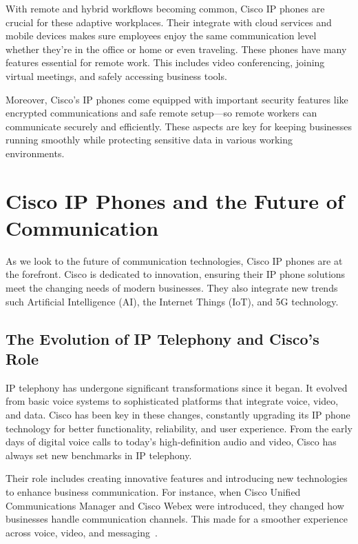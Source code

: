 \documentclass[11pt,a4paper]{article}
\begin{document}
With remote and hybrid workflows becoming common, Cisco IP phones are crucial for these adaptive workplaces. Their integrate with cloud services and mobile devices makes sure employees enjoy the same communication level whether they're in the office or home or even traveling. These phones have many features essential for remote work. This includes video conferencing, joining virtual meetings, and safely accessing business tools.

Moreover, Cisco's IP phones come equipped with important security features like encrypted communications and safe remote setup—so remote workers can communicate securely and efficiently. These aspects are key for keeping businesses running smoothly while protecting sensitive data in various working environments.

\section*{Cisco IP Phones and the Future of Communication}

As we look to the future of communication technologies, Cisco IP phones are at the forefront. Cisco is dedicated to innovation, ensuring their IP phone solutions meet the changing needs of modern businesses. They also integrate new trends such  Artificial Intelligence (AI), the Internet Things (IoT), and 5G technology.


\subsection*{The Evolution of IP Telephony and Cisco’s Role}

IP telephony has undergone significant transformations since it began. It evolved from basic voice systems to sophisticated platforms that integrate voice, video, and data. Cisco has been key in these changes, constantly upgrading its IP phone technology for better functionality, reliability, and user experience. From the early days of digital voice calls to today’s high-definition audio and video,
Cisco has always set new benchmarks in IP telephony.

Their role includes creating innovative features and introducing new technologies to enhance business communication. For instance, when Cisco Unified Communications Manager and Cisco Webex were introduced, they changed how businesses handle communication channels. This made for a smoother experience across voice, video, and messaging~\cite{IP-Telephony}.
\end{document}
